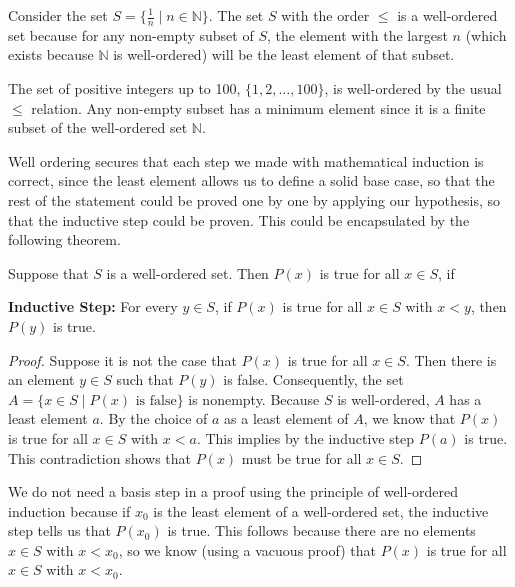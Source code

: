 \begin{example}
	Consider the set \( S = \{\frac{1}{n} \mid n \in \mathbb{N}\} \). The set \( S \) with the order \( \leq \) is a well-ordered set because for any non-empty subset of \( S \), the element with the largest \( n \) (which exists because \( \mathbb{N} \) is well-ordered) will be the least element of that subset.
\end{example}

\begin{example}
	The set of positive integers up to 100, \( \{1, 2, \ldots, 100\} \), is well-ordered by the usual \( \leq \) relation. Any non-empty subset has a minimum element since it is a finite subset of the well-ordered set \( \mathbb{N} \).
\end{example}

Well ordering secures that each step we made with mathematical induction is correct, since the least element allows us to define a solid base case, so that the rest of the statement could be proved one by one by applying our hypothesis, so that the inductive step could be proven. This could be encapsulated by the following theorem.
\begin{theorem}
	Suppose that \( S \) is a well-ordered set. Then \( P(x) \) is true for all \( x \in S \), if

		\textbf{Inductive Step:} For every \( y \in S \), if \( P(x) \) is true for all \( x \in S \) with \( x < y \), then \( P(y) \) is true.

\end{theorem}

\begin{proof}
	Suppose it is not the case that \( P(x) \) is true for all \( x \in S \). Then there is an element \( y \in S \) such that \( P(y) \) is false. Consequently, the set \( A = \{ x \in S \mid P(x) \text{ is false} \} \) is nonempty. Because \( S \) is well-ordered, \( A \) has a least element \( a \). By the choice of \( a \) as a least element of \( A \), we know that \( P(x) \) is true for all \( x \in S \) with \( x < a \). This implies by the inductive step \( P(a) \) is true. This contradiction shows that \( P(x) \) must be true for all \( x \in S \).
\end{proof}

\begin{remark}
	We do not need a basis step in a proof using the principle of well-ordered induction because if \( x_0 \) is the least element of a well-ordered set, the inductive step tells us that \( P(x_0) \) is true. This follows because there are no elements \( x \in S \) with \( x < x_0 \), so we know (using a vacuous proof) that \( P(x) \) is true for all \( x \in S \) with \( x < x_0 \).
\end{remark}

